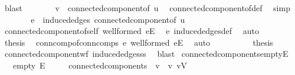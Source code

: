 \begin{isabellebody}
\ blast\isanewline
\ \ \ \ \isamarkupfalse%
\ \isamarkupfalse%
\ {\isachardoublequoteopen}v\ {\isasymin}\ connected{\isacharunderscore}{\kern0pt}component{\isacharunderscore}{\kern0pt}of\ u{\isachardoublequoteclose}\ \isamarkupfalse%
\ connected{\isacharunderscore}{\kern0pt}component{\isacharunderscore}{\kern0pt}of{\isacharunderscore}{\kern0pt}def\ \isamarkupfalse%
\ simp\isanewline
\ \ \ \ \isamarkupfalse%
\ \isamarkupfalse%
\ {\isachardoublequoteopen}e\ {\isasymin}\ induced{\isacharunderscore}{\kern0pt}edges\ {\isacharparenleft}{\kern0pt}connected{\isacharunderscore}{\kern0pt}component{\isacharunderscore}{\kern0pt}of\ u{\isacharparenright}{\kern0pt}{\isachardoublequoteclose}\ \isamarkupfalse%
\ connected{\isacharunderscore}{\kern0pt}component{\isacharunderscore}{\kern0pt}of{\isacharunderscore}{\kern0pt}self\ wellformed\ {\isacartoucheopen}e{\isasymin}E{\isacartoucheclose}\ \isamarkupfalse%
\ e\ induced{\isacharunderscore}{\kern0pt}edges{\isacharunderscore}{\kern0pt}def\ \isamarkupfalse%
\ auto\isanewline
\ \ \ \ \isamarkupfalse%
\ \isamarkupfalse%
\ {\isacharquery}{\kern0pt}thesis\ \isamarkupfalse%
\ conn{\isacharunderscore}{\kern0pt}comp{\isacharunderscore}{\kern0pt}of{\isacharunderscore}{\kern0pt}conn{\isacharunderscore}{\kern0pt}comps\ e\ wellformed\ {\isacartoucheopen}e{\isasymin}E{\isacartoucheclose}\ \isamarkupfalse%
\ auto\isanewline
\ \ \isamarkupfalse%
\ \isanewline
\ \ \isamarkupfalse%
\ \isamarkupfalse%
\ {\isacharquery}{\kern0pt}thesis\ \isamarkupfalse%
\ connected{\isacharunderscore}{\kern0pt}component{\isacharunderscore}{\kern0pt}wf\ induced{\isacharunderscore}{\kern0pt}edges{\isacharunderscore}{\kern0pt}ss\ \isamarkupfalse%
\ blast\isanewline
{}\isamarkupfalse%
%
\endisatagproof
{\isafoldproof}%
%
\isadelimproof
\isanewline
%
\endisadelimproof
\isanewline
{}\isamarkupfalse%
\ connected{\isacharunderscore}{\kern0pt}components{\isacharunderscore}{\kern0pt}empty{\isacharunderscore}{\kern0pt}E{\isacharcolon}{\kern0pt}\isanewline
\ \ \ empty{\isacharcolon}{\kern0pt}\ {\isachardoublequoteopen}E\ {\isacharequal}{\kern0pt}\ {\isacharbraceleft}{\kern0pt}{\isacharbraceright}{\kern0pt}{\isachardoublequoteclose}\isanewline
\ \ \ {\isachardoublequoteopen}connected{\isacharunderscore}{\kern0pt}components\ {\isacharequal}{\kern0pt}\ {\isacharbraceleft}{\kern0pt}{\isacharbraceleft}{\kern0pt}v{\isacharbraceright}{\kern0pt}\ {\isacharbar}{\kern0pt}\ v{\isachardot}{\kern0pt}\ v{\isasymin}V{\isacharbraceright}{\kern0pt}{\isachardoublequoteclose}\isanewline

\end{isabellebody}
